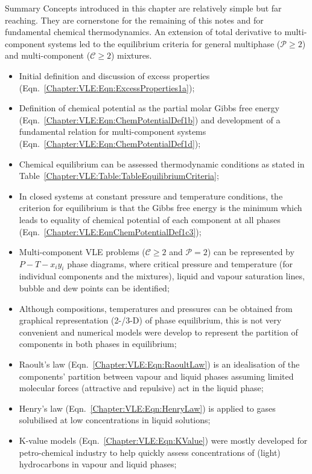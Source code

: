 \clearpage   
\begin{FinalSummaryBlock}{Summary}
     Concepts introduced in this chapter are relatively simple but far reaching. They are cornerstone for the remaining of this notes and for fundamental chemical thermodynamics. An extension of total derivative to multi-component systems led to the equilibrium criteria for general multiphase ($\mathcal{P}\ge2$) and multi-component ($\mathcal{C}\ge2$) mixtures.
    \begin{itemize}
       \item Initial definition and discussion of excess properties (Eqn.~\ref{Chapter:VLE:Eqn:ExcessProperties1a});
       \item Definition of chemical potential as the partial molar Gibbs free energy (Eqn.~\ref{Chapter:VLE:Eqn:ChemPotentialDef1b}) and development of a fundamental relation for multi-component systems (Eqn.~\ref{Chapter:VLE:Eqn:ChemPotentialDef1d});
       \item Chemical equilibrium can be assessed \wrt thermodynamic conditions as stated in Table~\ref{Chapter:VLE:Table:TableEquilibriumCriteria};
       \item In closed systems at constant pressure and temperature conditions, the criterion for equilibrium is that the Gibbs free energy is the minimum which leads to equality of chemical potential of each component at all phases (Eqn.~\ref{Chapter:VLE:EqnChemPotentialDef1c3});
       \item Multi-component VLE problems (\ie $\mathcal{C}\ge 2$ and $\mathcal{P}=2$) can be represented by $P-T-x_{i}y_{i}$ phase diagrams, where critical pressure and temperature (for individual components and the mixtures), liquid and vapour saturation lines, bubble and dew points can be identified;
       \item Although compositions, temperatures and pressures can be obtained from graphical representation (2-/3-D) of phase equilibrium, this is not very convenient and numerical models were develop to represent the partition of components in both phases in equilibrium;
       \item Raoult's law (Eqn.~\ref{Chapter:VLE:Eqn:RaoultLaw}) is an idealisation of the components' partition between vapour and liquid phases assuming limited molecular forces (\eg attractive and repulsive) act in the liquid phase;
       \item Henry's law (Eqn.~\ref{Chapter:VLE:Eqn:HenryLaw}) is applied to gases solubilised at low concentrations in liquid solutions;
       \item K-value models (Eqn.~\ref{Chapter:VLE:Eqn:KValue}) were mostly developed for petro-chemical industry to help quickly assess concentrations of (light) hydrocarbons in vapour and liquid phases;

\end{itemize}
\end{FinalSummaryBlock}
